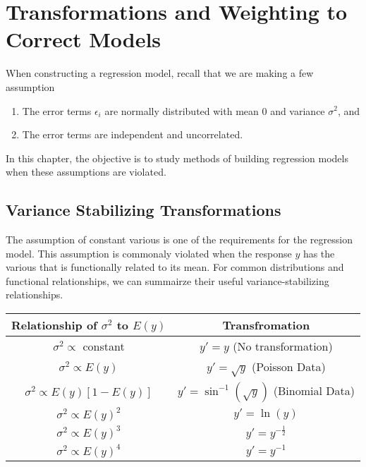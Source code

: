 
\chapter{Transformations and Weighting to Correct Models}

When constructing a regression model, recall that we are making a few assumption

\begin{enumerate}
    \item The error terms $\epsilon_i$ are normally distributed with mean 0 and variance $\sigma^2$, and 
    \item The error terms are independent and uncorrelated.
\end{enumerate} 

In this chapter, the objective is to study methods of building regression models when these assumptions are violated.   

\section{Variance Stabilizing Transformations}

The assumption of constant various is one of the requirements for the regression model. This assumption is commonaly violated when the response $y$ has the various that is functionally related to its mean. For common distributions and functional relationships, we can summairze their useful variance-stabilizing relationships.

\renewcommand{\arraystretch}{1.5}
\begin{center}
    \begin{tabular}{|c|c|}
        \hline
        Relationship of $\sigma^2$ to $E(y)$ & Transfromation \\
        \hline
        $\sigma^2 \propto$ constant & $y' = y$ (No transformation)\\
        $\sigma^2 \propto E(y)$ & $y' = \sqrt{y}$ (Poisson Data)\\
        $\sigma^2 \propto E(y)[1-E(y)]$ & $y' = \sin^{-1}(\sqrt{y})$ (Binomial Data)\\
        $\sigma^2 \propto E(y)^2$ & $y' = \ln(y)$\\
        $\sigma^2 \propto E(y)^3$ & $y'= y^{-\frac{1}{2}}$\\
        $\sigma^2 \propto E(y)^4$ & $y' = y^{-1}$ \\
        \hline
    \end{tabular}
\end{center}


